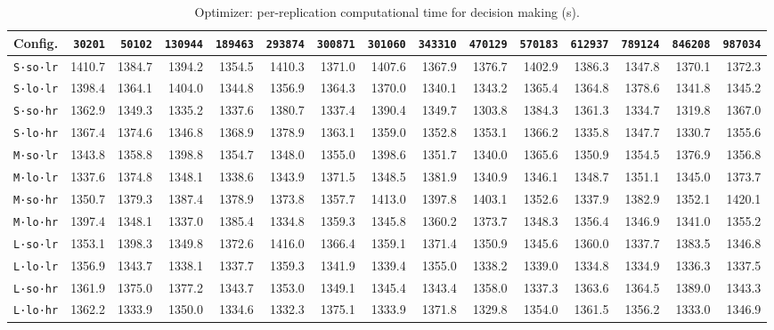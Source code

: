 \begin{table}[htb]
\centering
\small
\caption{Optimizer: per-replication computational time for decision making (s).}
\label{tab:app_time_opt_true}
\begin{tabular}{@{}lrrrrrrrrrrrrrr@{}}
\toprule
\textbf{Config.} & \texttt{30201} & \texttt{50102} & \texttt{130944} & \texttt{189463} & \texttt{293874} & \texttt{300871} & \texttt{301060} & \texttt{343310} & \texttt{470129} & \texttt{570183} & \texttt{612937} & \texttt{789124} & \texttt{846208} & \texttt{987034} \\
\midrule
\texttt{S·so·lr} & 1410.7 & 1384.7 & 1394.2 & 1354.5 & 1410.3 & 1371.0 & 1407.6 & 1367.9 & 1376.7 & 1402.9 & 1386.3 & 1347.8 & 1370.1 & 1372.3 \\
\texttt{S·lo·lr} & 1398.4 & 1364.1 & 1404.0 & 1344.8 & 1356.9 & 1364.3 & 1370.0 & 1340.1 & 1343.2 & 1365.4 & 1364.8 & 1378.6 & 1341.8 & 1345.2 \\
\texttt{S·so·hr} & 1362.9 & 1349.3 & 1335.2 & 1337.6 & 1380.7 & 1337.4 & 1390.4 & 1349.7 & 1303.8 & 1384.3 & 1361.3 & 1334.7 & 1319.8 & 1367.0 \\
\texttt{S·lo·hr} & 1367.4 & 1374.6 & 1346.8 & 1368.9 & 1378.9 & 1363.1 & 1359.0 & 1352.8 & 1353.1 & 1366.2 & 1335.8 & 1347.7 & 1330.7 & 1355.6 \\
\texttt{M·so·lr} & 1343.8 & 1358.8 & 1398.8 & 1354.7 & 1348.0 & 1355.0 & 1398.6 & 1351.7 & 1340.0 & 1365.6 & 1350.9 & 1354.5 & 1376.9 & 1356.8 \\
\texttt{M·lo·lr} & 1337.6 & 1374.8 & 1348.1 & 1338.6 & 1343.9 & 1371.5 & 1348.5 & 1381.9 & 1340.9 & 1346.1 & 1348.7 & 1351.1 & 1345.0 & 1373.7 \\
\texttt{M·so·hr} & 1350.7 & 1379.3 & 1387.4 & 1378.9 & 1373.8 & 1357.7 & 1413.0 & 1397.8 & 1403.1 & 1352.6 & 1337.9 & 1382.9 & 1352.1 & 1420.1 \\
\texttt{M·lo·hr} & 1397.4 & 1348.1 & 1337.0 & 1385.4 & 1334.8 & 1359.3 & 1345.8 & 1360.2 & 1373.7 & 1348.3 & 1356.4 & 1346.9 & 1341.0 & 1355.2 \\
\texttt{L·so·lr} & 1353.1 & 1398.3 & 1349.8 & 1372.6 & 1416.0 & 1366.4 & 1359.1 & 1371.4 & 1350.9 & 1345.6 & 1360.0 & 1337.7 & 1383.5 & 1346.8 \\
\texttt{L·lo·lr} & 1356.9 & 1343.7 & 1338.1 & 1337.7 & 1359.3 & 1341.9 & 1339.4 & 1355.0 & 1338.2 & 1339.0 & 1334.8 & 1334.9 & 1336.3 & 1337.5 \\
\texttt{L·so·hr} & 1361.9 & 1375.0 & 1377.2 & 1343.7 & 1353.0 & 1349.1 & 1345.4 & 1343.4 & 1358.0 & 1337.3 & 1363.6 & 1364.5 & 1389.0 & 1343.3 \\
\texttt{L·lo·hr} & 1362.2 & 1333.9 & 1350.0 & 1334.6 & 1332.3 & 1375.1 & 1333.9 & 1371.8 & 1329.8 & 1354.0 & 1361.5 & 1356.2 & 1333.0 & 1346.9 \\
\bottomrule
\end{tabular}
\end{table}

